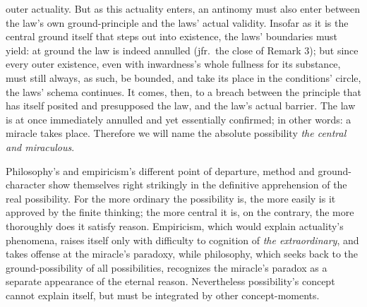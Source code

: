 \documentclass[12pt]{book}
\begin{document}
outer actuality. But as this actuality enters, an antinomy must also enter
between the law's own ground-principle and the laws' actual validity.
Insofar as it is the central ground itself that steps out into existence,
the laws' boundaries must yield: at ground the law is indeed annulled (jfr.\
the close of Remark 3); but since every outer existence, even with
inwardness's whole fullness for its substance, must still always, as such,
be bounded, and take its place in the conditions' circle, the laws' schema
continues. It comes, then, to a breach between the principle that has itself
posited and presupposed the law, and the law's actual barrier. The law is at
once immediately annulled and yet essentially confirmed; in other words:
a miracle takes place. Therefore we will name the absolute possibility
\emph{the central and miraculous}.

Philosophy's and empiricism's different point of departure, method and
ground-character show themselves right strikingly in the definitive
apprehension of the real possibility. For the more ordinary the possibility
is, the more easily is it approved by the finite thinking; the more central
it is, on the contrary, the more thoroughly does it satisfy reason.
Empiricism, which would explain actuality's phenomena, raises itself only
with difficulty to cognition of \emph{the extraordinary}, and takes offense
at the miracle's paradoxy, while philosophy, which seeks back to the
ground-possibility of all possibilities, recognizes the miracle's paradox as
a separate appearance of the eternal reason. Nevertheless possibility's
concept cannot explain itself, but must be integrated by other
concept-moments.
\end{document}
